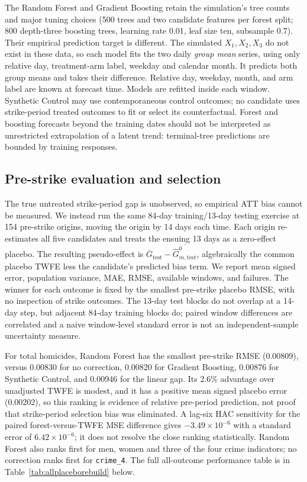 The Random Forest and Gradient Boosting retain the simulation's tree counts and major tuning choices (500 trees and two candidate features per forest split; 800 depth-three boosting trees, learning rate 0.01, leaf size ten, subsample 0.7). Their empirical prediction target is different. The simulated $X_1,X_2,X_3$ do not exist in these data, so each model fits the two daily \emph{group mean} series, using only relative day, treatment-arm label, weekday and calendar month. It predicts both group means and takes their difference. Relative day, weekday, month, and arm label are known at forecast time. Models are refitted inside each window. Synthetic Control may use contemporaneous control outcomes; no candidate uses strike-period treated outcomes to fit or select its counterfactual. Forest and boosting forecasts beyond the training dates should not be interpreted as unrestricted extrapolation of a latent trend: terminal-tree predictions are bounded by training responses.

\subsection{Pre-strike evaluation and selection}
The true untreated strike-period gap is unobserved, so empirical ATT bias cannot be measured. We instead run the same 84-day training/13-day testing exercise at 154 pre-strike origins, moving the origin by 14 days each time. Each origin re-estimates all five candidates and treats the ensuing 13 days as a zero-effect placebo. The resulting pseudo-effect is $\overline G_{\mathrm{test}}-\overline{\widehat G^0_{m,\mathrm{test}}}$, algebraically the common placebo TWFE less the candidate's predicted bias term. We report mean signed error, population variance, MAE, RMSE, available windows, and failures. The winner for each outcome is fixed by the smallest pre-strike placebo RMSE, with no inspection of strike outcomes. The 13-day test blocks do not overlap at a 14-day step, but adjacent 84-day training blocks do; paired window differences are correlated and a naive window-level standard error is not an independent-sample uncertainty measure.



For total homicides, Random Forest has the smallest pre-strike RMSE (0.00809), versus 0.00830 for no correction, 0.00820 for Gradient Boosting, 0.00876 for Synthetic Control, and 0.00946 for the linear gap. Its 2.6\% advantage over unadjusted TWFE is modest, and it has a positive mean signed placebo error (0.00202), so this ranking is evidence of relative pre-period prediction, not proof that strike-period selection bias was eliminated. A lag-six HAC sensitivity for the paired forest-versus-TWFE MSE difference gives $-3.49\times10^{-6}$ with a standard error of $6.42\times10^{-6}$; it does not resolve the close ranking statistically. Random Forest also ranks first for men, women and three of the four crime indicators; no correction ranks first for \texttt{crime\_4}. The full all-outcome performance table is in Table~\ref{tab:allplaceborebuild} below.

